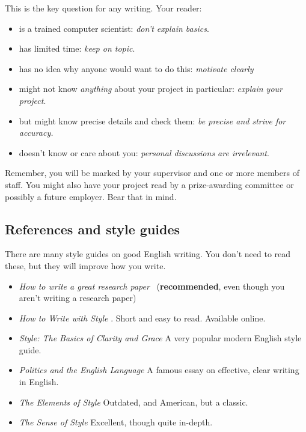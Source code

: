 \documentclass{l4proj}
\begin{document}
This is the key question for any writing. Your reader:
\begin{itemize}
    \item
    is a trained computer scientist: \emph{don't explain basics}.
    \item
    has limited time: \emph{keep on topic}.
    \item
    has no idea why anyone would want to do this: \emph{motivate clearly}
    \item
    might not know \emph{anything} about your project in particular:
    \emph{explain your project}.
    \item
    but might know precise details and check them: \emph{be precise and
    strive for accuracy.}
    \item
    doesn't know or care about you: \emph{personal discussions are
    irrelevant}.
\end{itemize}

Remember, you will be marked by your supervisor and one or more members
of staff. You might also have your project read by a prize-awarding
committee or possibly a future employer. Bear that in mind.

\subsection{References and style guides}
There are many style guides on good English writing. You don't need to
read these, but they will improve how you write.

\begin{itemize}
    \item
    \emph{How to write a great research paper}~\cite{Pey17} (\textbf{recommended}, even though you aren't writing a research paper)
    \item
    \emph{How to Write with Style} \cite{Von80}. Short and easy to read. Available online.
    \item
    \emph{Style: The Basics of Clarity and Grace} \cite{Wil09} A very popular modern English style guide.
    \item
    \emph{Politics and the English Language} \cite{Orw68}  A famous essay on effective, clear writing in English.
    \item
    \emph{The Elements of Style} \cite{StrWhi07} Outdated, and American, but a classic.
    \item
    \emph{The Sense of Style} \cite{Pin15} Excellent, though quite in-depth.
\end{itemize}
\end{document}
